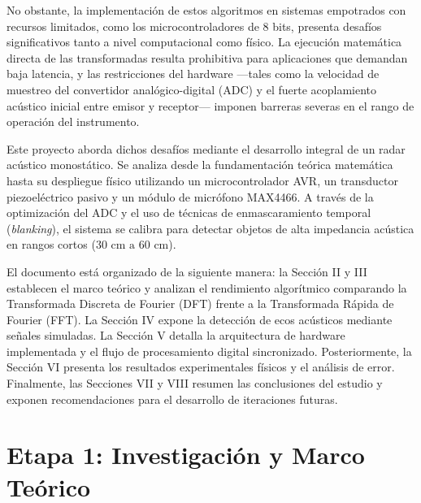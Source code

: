 \documentclass[conference]{IEEEtran}
\begin{document}
No obstante, la implementación de estos algoritmos en sistemas empotrados con recursos limitados, como los microcontroladores de 8 bits, presenta desafíos significativos tanto a nivel computacional como físico. La ejecución matemática directa de las transformadas resulta prohibitiva para aplicaciones que demandan baja latencia, y las restricciones del hardware —tales como la velocidad de muestreo del convertidor analógico-digital (ADC) y el fuerte acoplamiento acústico inicial entre emisor y receptor— imponen barreras severas en el rango de operación del instrumento.

Este proyecto aborda dichos desafíos mediante el desarrollo integral de un radar acústico monostático. Se analiza desde la fundamentación teórica matemática hasta su despliegue físico utilizando un microcontrolador AVR, un transductor piezoeléctrico pasivo y un módulo de micrófono MAX4466. A través de la optimización del ADC y el uso de técnicas de enmascaramiento temporal (\textit{blanking}), el sistema se calibra para detectar objetos de alta impedancia acústica en rangos cortos ($30\text{ cm a }60\text{ cm}$).

El documento está organizado de la siguiente manera: la Sección II y III establecen el marco teórico y analizan el rendimiento algorítmico comparando la Transformada Discreta de Fourier (DFT) frente a la Transformada Rápida de Fourier (FFT). La Sección IV expone la detección de ecos acústicos mediante señales simuladas. La Sección V detalla la arquitectura de hardware implementada y el flujo de procesamiento digital sincronizado. Posteriormente, la Sección VI presenta los resultados experimentales físicos y el análisis de error. Finalmente, las Secciones VII y VIII resumen las conclusiones del estudio y exponen recomendaciones para el desarrollo de iteraciones futuras.

\section{Etapa 1: Investigación y Marco Teórico}
\end{document}
